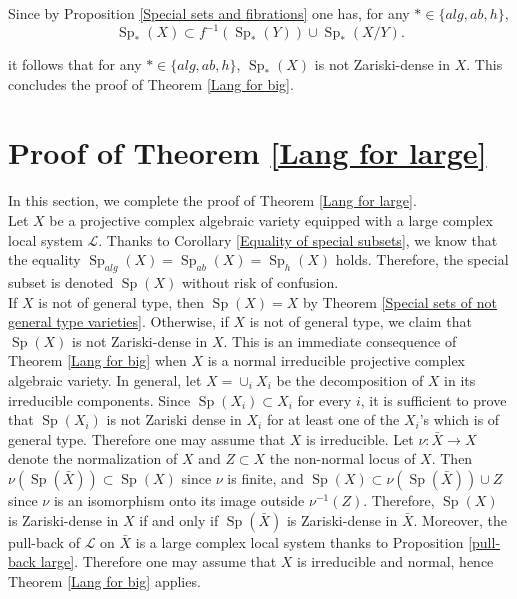 \documentclass[11pt,letterpaper]{amsart}
\def\cL{\mathcal{L}}
\theoremstyle{plain}
\DeclareMathOperator{\Sp}{Sp}
\begin{document}
Since by Proposition \ref{Special sets and fibrations} one has, for any $\ast \in \{ alg, ab, h \}$,
\[ \Sp_\ast(X) \subset f^{-1} \left( \Sp_\ast(Y) \right)  \cup \Sp_\ast(X/Y) . \]

it follows that for any $\ast \in \{ alg, ab, h \}$, $\Sp_{\ast}(X)$ is not Zariski-dense in $X$. This concludes the proof of Theorem \ref{Lang for big}.





\section{Proof of Theorem \ref{Lang for large}}

In this section, we complete the proof of Theorem \ref{Lang for large}.\\

Let $X$ be a projective complex algebraic variety equipped with a large complex local system $\cL$. Thanks to 
 Corollary \ref{Equality of special subsets}, we know that the equality $\Sp_{alg}(X) = \Sp_{ab}(X) = \Sp_h(X)$ holds. Therefore, the special subset is denoted $\Sp(X)$ without risk of confusion.\\

If $X$ is not of general type, then $\Sp(X) = X$ by Theorem \ref{Special sets of not general type varieties}. Otherwise, if $X$ is not of general type, we claim that $\Sp(X)$ is not Zariski-dense in $X$. This is an immediate consequence of Theorem \ref{Lang for big} when $X$ is a normal irreducible projective complex algebraic variety. In general, let $X = \cup_i X_i$ be the decomposition of $X$ in its irreducible components. Since $\Sp(X_i) \subset X_i$ for every $i$, it is sufficient to prove that $\Sp(X_i)$ is not Zariski dense in $X_i$ for at least one of the $X_i$'s which is of general type. Therefore one may assume that $X$ is irreducible. Let $\nu \colon \bar X \to X $ denote the normalization of $X$ and $Z \subset X$ the non-normal locus of $X$. Then $\nu(\Sp(\bar X)) \subset \Sp(X)$ since $\nu$ is finite, and $\Sp(X) \subset \nu(\Sp(\bar X))
 \cup Z$ since $\nu$ is an isomorphism onto its image outside $\nu^{-1}(Z)$. Therefore, $\Sp(X)$ is Zariski-dense in $X$ if and only if $\Sp(\bar X)$ is Zariski-dense in $\bar X$. Moreover, the pull-back of $\cL$ on $\bar X$ is a large complex local system thanks to Proposition \ref{pull-back large}. Therefore one may assume that $X$ is irreducible and normal, hence Theorem \ref{Lang for big} applies. \\
\end{document}
